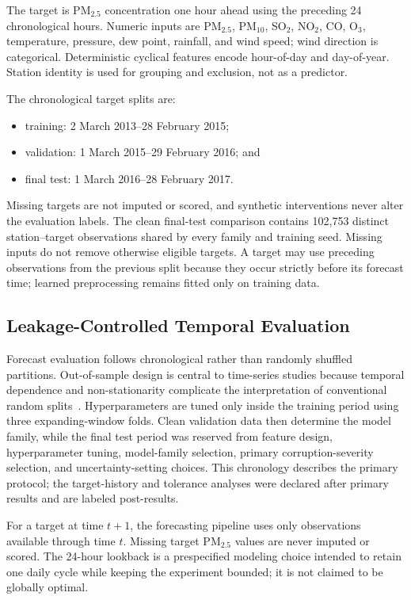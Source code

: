 \documentclass[journal]{IEEEtran}
\begin{document}
The target is PM$_{2.5}$ concentration one hour ahead using the preceding 24 chronological hours. Numeric inputs are PM$_{2.5}$, PM$_{10}$, SO$_2$, NO$_2$, CO, O$_3$, temperature, pressure, dew point, rainfall, and wind speed; wind direction is categorical. Deterministic cyclical features encode hour-of-day and day-of-year. Station identity is used for grouping and exclusion, not as a predictor.

The chronological target splits are:
\begin{itemize}[leftmargin=*,itemsep=1pt]
\item training: 2 March 2013--28 February 2015;
\item validation: 1 March 2015--29 February 2016; and
\item final test: 1 March 2016--28 February 2017.
\end{itemize}
Missing targets are not imputed or scored, and synthetic interventions never alter the evaluation labels. The clean final-test comparison contains 102,753 distinct station--target observations shared by every family and training seed. Missing inputs do not remove otherwise eligible targets. A target may use preceding observations from the previous split because they occur strictly before its forecast time; learned preprocessing remains fitted only on training data.

\subsection{Leakage-Controlled Temporal Evaluation}
Forecast evaluation follows chronological rather than randomly shuffled partitions. Out-of-sample design is central to time-series studies because temporal dependence and non-stationarity complicate the interpretation of conventional random splits~\cite{tashman2000oos,bergmeir2018cv}. Hyperparameters are tuned only inside the training period using three expanding-window folds. Clean validation data then determine the model family, while the final test period was reserved from feature design, hyperparameter tuning, model-family selection, primary corruption-severity selection, and uncertainty-setting choices. This chronology describes the primary protocol; the target-history and tolerance analyses were declared after primary results and are labeled post-results.

For a target at time $t+1$, the forecasting pipeline uses only observations available through time $t$. Missing target PM$_{2.5}$ values are never imputed or scored. The 24-hour lookback is a prespecified modeling choice intended to retain one daily cycle while keeping the experiment bounded; it is not claimed to be globally optimal.
\end{document}
